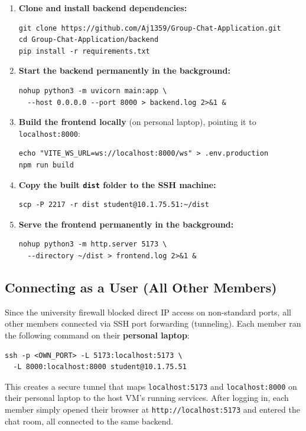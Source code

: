\documentclass[12pt, a4paper]{article}
\begin{document}
\begin{enumerate}
    \item \textbf{Clone and install backend dependencies:}
    \begin{verbatim}
git clone https://github.com/Aj1359/Group-Chat-Application.git
cd Group-Chat-Application/backend
pip install -r requirements.txt
    \end{verbatim}

    \item \textbf{Start the backend permanently in the background:}
    \begin{verbatim}
nohup python3 -m uvicorn main:app \
  --host 0.0.0.0 --port 8000 > backend.log 2>&1 &
    \end{verbatim}

    \item \textbf{Build the frontend locally} (on personal laptop), pointing it to \texttt{localhost:8000}:
    \begin{verbatim}
echo "VITE_WS_URL=ws://localhost:8000/ws" > .env.production
npm run build
    \end{verbatim}

    \item \textbf{Copy the built \texttt{dist} folder to the SSH machine:}
    \begin{verbatim}
scp -P 2217 -r dist student@10.1.75.51:~/dist
    \end{verbatim}

    \item \textbf{Serve the frontend permanently in the background:}
    \begin{verbatim}
nohup python3 -m http.server 5173 \
  --directory ~/dist > frontend.log 2>&1 &
    \end{verbatim}
\end{enumerate}

\subsection{Connecting as a User (All Other Members)}
Since the university firewall blocked direct IP access on non-standard ports, all other members connected via SSH port forwarding (tunneling). Each member ran the following command on their \textbf{personal laptop}:
\begin{verbatim}
ssh -p <OWN_PORT> -L 5173:localhost:5173 \
  -L 8000:localhost:8000 student@10.1.75.51
\end{verbatim}

This creates a secure tunnel that maps \texttt{localhost:5173} and \texttt{localhost:8000} on their personal laptop to the host VM's running services. After logging in, each member simply opened their browser at \texttt{http://localhost:5173} and entered the chat room, all connected to the same backend.
\end{document}
